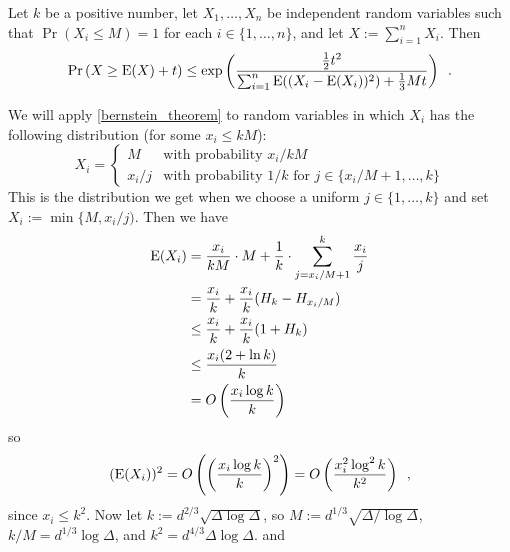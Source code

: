 \documentclass{patmorin}
\begin{document}
\begin{thm}\label{bernstein_theorem}
  Let $k$ be a positive number, let $X_1,\ldots,X_n$ be independent random variables such that $\Pr(X_i\le M)=1$ for each $i\in\{1,\ldots,n\}$, and let $X:=\sum_{i=1}^n X_i$. Then
  \begin{equation}
    \Pr\left(X \ge \mathrm{E}(X)+ t\right)
      \le \exp\left(\frac{\tfrac{1}{2}t^2}{\sum_{i=1}^n \mathrm{E}((X_i-\mathrm{E}(X_i))^2)+\tfrac{1}{3}Mt}\right) \enspace . \label{bernstein}
  \end{equation}
\end{thm}
We will apply \cref{bernstein_theorem} to random variables in which $X_i$ has the following distribution (for some $x_i\le kM$):
\[
  X_i = \begin{cases}
          M & \text{with probability $x_i/kM$} \\
          x_i/j & \text{with probability $1/k$ for $j\in\{x_i/M+1,\ldots,k\}$}
        \end{cases}
\]
This is the distribution we get when we choose a uniform $j\in\{1,\ldots,k\}$ and set $X_i:=\min\{M,x_i/j)$.
Then we have
\begin{align*}
  \mathrm{E}(X_i)
  & =\frac{x_i}{kM}\cdot M + \frac{1}{k}\cdot\sum_{j=x_i/M+1}^k \frac{x_i}{j} \\
  & = \frac{x_i}{k} + \frac{x_i}{k}(H_{k}-H_{x_i/M}) \\
  & \le \frac{x_i}{k} + \frac{x_i}{k}(1+H_{k}) \\
  & \le \frac{x_i(2+\ln k)}{k} \\
  & = O\left(\frac{x_i\log k}{k}\right)
\end{align*}
so
\[
  (\mathrm{E}(X_i))^2 = O\left(\left(\frac{x_i\log k}{k}\right)^2\right) = O\left(\frac{x_i^2\log^2 k}{k^2}\right) \enspace ,
\]
since $x_i\le k^2$.  Now let $k:=d^{2/3}\sqrt{\Delta\log\Delta}$, so $M:=d^{1/3}\sqrt{\Delta/\log\Delta}$, $k/M=d^{1/3}\log\Delta$, and $k^2=d^{4/3}\Delta\log\Delta$.
and
\end{document}
